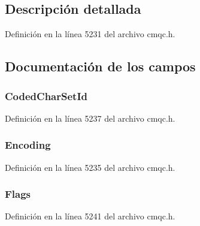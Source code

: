 \subsection{Descripción detallada}


Definición en la línea 5231 del archivo cmqc.\+h.



\subsection{Documentación de los campos}
\hypertarget{structtag_m_q_w_i_h_a4d8d1961a991850d1355cdf9b4680b8e}{}
\subsubsection[{Coded\+Char\+Set\+Id}]{ Coded\+Char\+Set\+Id}\label{structtag_m_q_w_i_h_a4d8d1961a991850d1355cdf9b4680b8e}


Definición en la línea 5237 del archivo cmqc.\+h.

\hypertarget{structtag_m_q_w_i_h_a30167bf454a49a60fd3fe4e9e586af34}{}
\subsubsection[{Encoding}]{ Encoding}\label{structtag_m_q_w_i_h_a30167bf454a49a60fd3fe4e9e586af34}


Definición en la línea 5235 del archivo cmqc.\+h.

\hypertarget{structtag_m_q_w_i_h_a8da770267273b200fa9c968fa2a0da57}{}
\subsubsection[{Flags}]{ Flags}\label{structtag_m_q_w_i_h_a8da770267273b200fa9c968fa2a0da57}


Definición en la línea 5241 del archivo cmqc.\+h.

\hypertarget{structtag_m_q_w_i_h_a435a478822008713f8aaff89f369ed63}{}
